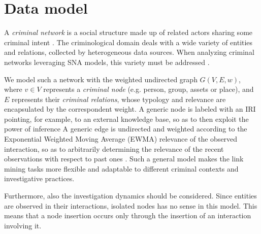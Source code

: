 \section{Data model}
\label{sec:data-model}

A \textit{criminal network} is a social structure made up of related actors sharing some criminal intent \cite{von2001organisierte}. 
The criminological domain deals with a wide variety of entities and relations, collected by heterogeneous data sources. 
When analyzing criminal networks leveraging SNA models, this variety must be addressed \cite{pramanik2016framework}.

We model such a network with the weighted undirected graph $G(V,E,w)$, where $v\in V$ represents a \textit{criminal node} (e.g. person, group, assets or place), and $E$ represents their \textit{criminal relations}, whose typology and relevance are encapsulated by the correspondent weight.
A generic node is labeled with an IRI pointing, for example, to an external knowledge base, so as to then exploit the power of inference
A generic edge is undirected and weighted according to the Exponential Weighted Moving Average (EWMA) relevance of the observed interaction, so as to arbitrarily determining the relevance of the recent observations with respect to past ones \cite{lucas1990exponentially}. 
Such a general model makes the link mining tasks more flexible and adaptable to different criminal contexts and investigative practices.

Furthermore, also the investigation dynamics should be considered. Since entities are observed in their interactions, isolated nodes has no sense in this model. This means that a node insertion occurs only through the insertion of an interaction involving it.

